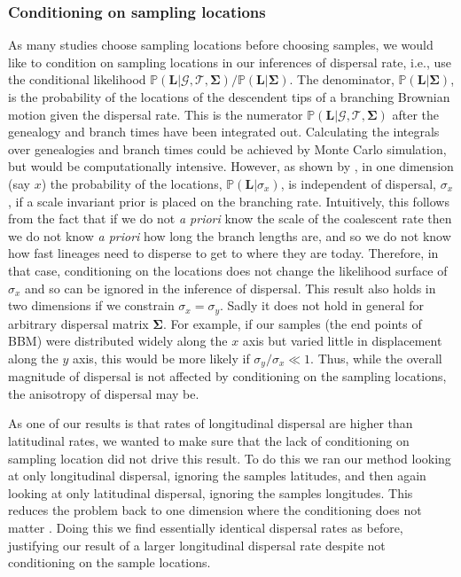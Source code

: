 \documentclass[12pt]{article}
\begin{document}
\subsubsection*{Conditioning on sampling locations}

As many studies choose sampling locations before choosing samples, we would like to condition on sampling locations in our inferences of dispersal rate, i.e., use the conditional likelihood $\mathbb{P}(\mathbf{L} | \mathcal{G},\mathcal{T}, \mathbf{\Sigma})/\mathbb{P}(\mathbf{L} | \mathbf{\Sigma})$.
The denominator, $\mathbb{P}(\mathbf{L} | \mathbf{\Sigma})$, is the probability of the locations of the descendent tips of a branching Brownian motion given the dispersal rate.
This is the numerator $\mathbb{P}(\mathbf{L} | \mathcal{G},\mathcal{T}, \mathbf{\Sigma})$ after the genealogy and branch times have been integrated out. 
Calculating the integrals over genealogies and branch times could be achieved by Monte Carlo simulation, but would be computationally intensive. However, as shown by \citep{meligkotsidou2007postprocessing}, in one dimension (say $x$) the probability of the locations, $\mathbb{P}(\mathbf{L} | \sigma_x)$, is independent of dispersal, $\sigma_x$, if a scale invariant prior is placed on the branching rate. 
Intuitively, this follows from the fact that if we do not {\it a priori} know the scale of the coalescent rate then we do not know {\it a priori} how long the branch lengths are, and so we do not know how fast lineages need to disperse to get to where they are today. 
Therefore, in that case, conditioning on the locations does not change the likelihood surface of $\sigma_x$ and so can be ignored in the inference of dispersal. 
This result also holds in two dimensions if we constrain $\sigma_x=\sigma_y$. 
Sadly it does not hold in general for arbitrary dispersal matrix $\mathbf{\Sigma}$. 
For example, if our samples (the end points of BBM) were distributed widely along the $x$ axis but varied little in displacement along the $y$ axis, this would be more likely if $\sigma_y/\sigma_x \ll 1$. 
Thus, while the overall magnitude of dispersal is not affected by conditioning on the sampling locations, the anisotropy of dispersal may be. 

As one of our results is that rates of longitudinal dispersal are higher than latitudinal rates, we wanted to make sure that the lack of conditioning on sampling location did not drive this result. 
To do this we ran our method looking at only longitudinal dispersal, ignoring the samples latitudes, and then again looking at only latitudinal dispersal, ignoring the samples longitudes. 
This reduces the problem back to one dimension where the conditioning does not matter \citep[as discussed above and in][]{meligkotsidou2007postprocessing}. 
Doing this we find essentially identical dispersal rates as before, justifying our result of a larger longitudinal dispersal rate despite not conditioning on the sample locations.  
\end{document}
